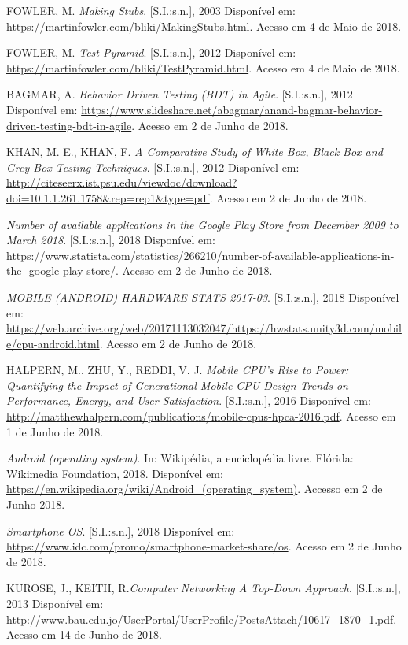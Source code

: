 \documentclass[
    12pt,       %
    openright,      %
    twoside,      %
    a4paper,      %
    english,      %
    french,       %
    spanish,      %
    brazil,       %
    ]{abntex2}
\begin{document}
  \noindent
  FOWLER, M. \textit{Making Stubs}. [S.I.:s.n.], 2003 Disponível em:
  \url{https://martinfowler.com/bliki/MakingStubs.html}. Acesso em 4 de Maio de 2018.

  \noindent
  FOWLER, M. \textit{Test Pyramid}. [S.I.:s.n.], 2012 Disponível em:
  \url{https://martinfowler.com/bliki/TestPyramid.html}. Acesso em 4 de Maio de 2018.

  \noindent
  BAGMAR, A. \textit{Behavior Driven Testing (BDT) in Agile}. [S.I.:s.n.], 2012 Disponível em:
  \url{https://www.slideshare.net/abagmar/anand-bagmar-behavior-driven-testing-bdt-in-agile}. Acesso em 2 de Junho de 2018.

  \noindent
  KHAN, M. E., KHAN, F. \textit{A Comparative Study of White Box, Black Box and Grey Box Testing Techniques}. [S.I.:s.n.], 2012 Disponível em: \url{http://citeseerx.ist.psu.edu/viewdoc/download?doi=10.1.1.261.1758&rep=rep1&type=pdf}. Acesso em 2 de Junho de 2018.

  \noindent
  \textit{Number of available applications in the Google Play Store from December 2009 to March 2018}.
  [S.I.:s.n.], 2018 Disponível em: \url{https://www.statista.com/statistics/266210/number-of-available-applications-in-the -google-play-store/}. Acesso em 2 de Junho de 2018.

  \noindent
  \textit{MOBILE (ANDROID) HARDWARE STATS 2017-03}. [S.I.:s.n.], 2018 Disponível em: \url{https://web.archive.org/web/20171113032047/https://hwstats.unity3d.com/mobile/cpu-android.html}. Acesso em 2 de Junho de 2018.

  \noindent
  HALPERN, M., ZHU, Y., REDDI, V. J. \textit{Mobile CPU’s Rise to Power: Quantifying the Impact of Generational Mobile CPU Design Trends on Performance, Energy, and User Satisfaction}.
  [S.I.:s.n.], 2016 Disponível em: \url{http://matthewhalpern.com/publications/mobile-cpus-hpca-2016.pdf}. Acesso em 1 de Junho de 2018.

  \noindent
  \textit{Android (operating system)}. In: Wikipédia, a enciclopédia livre. Flórida: Wikimedia Foundation,
  2018. Disponível em:
  \url{https://en.wikipedia.org/wiki/Android_(operating_system)}. Accesso
  em 2 de Junho 2018.

  \noindent
  \textit{Smartphone OS}. [S.I.:s.n.], 2018 Disponível em: \url{https://www.idc.com/promo/smartphone-market-share/os}.
  Acesso em 2 de Junho de 2018.

  \noindent
  KUROSE, J., KEITH, R.\textit{Computer Networking A Top-Down Approach}. [S.I.:s.n.], 2013 Disponível em: \url{http://www.bau.edu.jo/UserPortal/UserProfile/PostsAttach/10617_1870_1.pdf}. Acesso em 14 de Junho de 2018.
\end{document}
